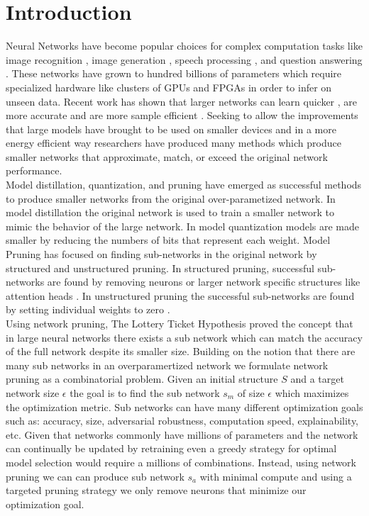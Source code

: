 \documentclass[runningheads]{llncs}
\begin{document}
\section{Introduction}
Neural Networks have become popular choices for complex computation tasks like image recognition \cite{Howard2017MobileNetsEC}, image generation \cite{Goodfellow2014GenerativeAN}, speech processing \cite{Zhao2017RecurrentCN}, and question answering \cite{Seo2017BidirectionalAF}. These networks have grown to hundred billions of parameters \cite{Brown2020LanguageMA} which require specialized hardware like clusters of GPUs and FPGAs in order to infer on unseen data. Recent work has shown that larger networks can learn quicker \cite{Li2020TrainLT}, are more accurate and are more sample efficient \cite{Kaplan2020ScalingLF}. Seeking to allow the improvements that large models have brought to be used on smaller devices and in a more energy efficient way researchers have produced many methods which produce smaller networks that approximate, match, or exceed the original network performance. \\ 
Model distillation, quantization, and pruning have emerged as successful methods to produce smaller networks from the original over-parametized network. In model distillation  \cite{Ba2014DoDN} the original network is used to train a smaller network to mimic the behavior of the large network. In model quantization \cite{Han2016DeepCC} models are made smaller by  reducing the numbers of bits that represent each weight. Model Pruning \cite{LeCun1989OptimalBD} has focused on finding sub-networks in the original network by structured and unstructured pruning. In structured pruning, successful sub-networks are found by removing neurons  \cite{Wang2019StructuredPF} or larger network specific structures like attention heads \cite{Voita2019AnalyzingMS}. In unstructured pruning the successful sub-networks are found by setting individual weights to zero \cite{Kwon2019StructuredCB}. \\
Using network pruning, The Lottery Ticket Hypothesis \cite{Frankle2019TheLT} proved the concept that in large neural networks there exists a sub network which can match the accuracy of the full network despite its smaller size. Building on the notion that there are many sub networks in an overparamertized network we formulate network pruning as a combinatorial problem. Given an initial structure $S$ and a target network size $\epsilon$ the goal is to find the sub network $s_m$ of size $\epsilon$ which maximizes the optimization metric. Sub networks can have many different optimization goals such as: accuracy, size, adversarial robustness, computation speed, explainability, etc. Given that networks commonly have millions of parameters and the network can continually be updated by retraining even a greedy strategy for optimal model selection would require a millions of combinations. Instead, using network pruning we can can produce sub network $s_a$ with minimal compute and using a targeted pruning strategy we only remove neurons that minimize our optimization goal. \\
\end{document}
